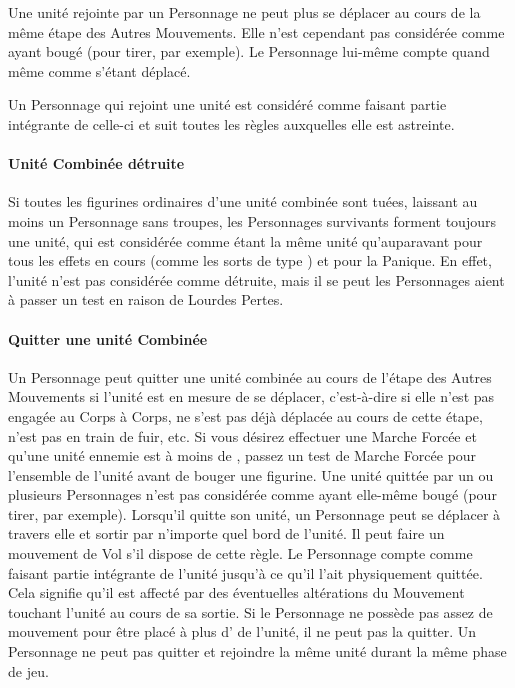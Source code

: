 Une unité rejointe par un Personnage ne peut plus se déplacer au cours de la même étape des Autres Mouvements. Elle n'est cependant pas considérée comme ayant bougé (pour tirer, par exemple). Le Personnage lui-même compte quand même comme s'étant déplacé.

Un Personnage qui rejoint une unité est considéré comme faisant partie intégrante de celle-ci et suit toutes les règles auxquelles elle est astreinte.

\paragraph{Unité Combinée détruite}

Si toutes les figurines ordinaires d'une unité combinée sont tuées, laissant au moins un Personnage sans troupes, les Personnages survivants forment toujours une unité, qui est considérée comme étant la même unité qu'auparavant pour tous les effets en cours (comme les sorts de type \lastsoneturn{}) et pour la Panique. En effet, l'unité n'est pas considérée comme détruite, mais il se peut les Personnages aient à passer un test en raison de Lourdes Pertes.

\paragraph{Quitter une unité Combinée}
\label{leaving_a_combined_unit}

Un Personnage peut quitter une unité combinée au cours de l'étape des Autres Mouvements si l'unité est en mesure de se déplacer, c'est-à-dire si elle n'est pas engagée au Corps à Corps, ne s'est pas déjà déplacée au cours de cette étape, n'est pas en train de fuir, etc. Si vous désirez effectuer une Marche Forcée et qu'une unité ennemie est à moins de , passez un test de Marche Forcée pour l'ensemble de l'unité avant de bouger une figurine. Une unité quittée par un ou plusieurs Personnages n'est pas considérée comme ayant elle-même bougé (pour tirer, par exemple). Lorsqu'il quitte son unité, un Personnage peut se déplacer à travers elle et sortir par n'importe quel bord de l'unité. Il peut faire un mouvement de Vol s'il dispose de cette règle. Le Personnage compte comme faisant partie intégrante de l'unité jusqu'à ce qu'il l'ait physiquement quittée. Cela signifie qu'il est affecté par des éventuelles altérations du Mouvement touchant l'unité au cours de sa sortie. Si le Personnage ne possède pas assez de mouvement pour être placé à plus d' de l'unité, il ne peut pas la quitter. Un Personnage ne peut pas quitter et rejoindre la même unité durant la même phase de jeu.

